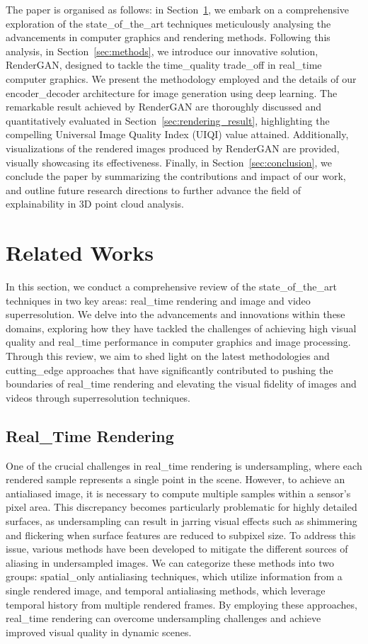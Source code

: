 The paper is organised as follows: in Section~\ref{sec:sota}, we embark on a comprehensive exploration of the state_of_the_art techniques meticulously analysing the advancements in computer graphics and rendering methods. Following this analysis, in Section~\ref{sec:methods}, we introduce our innovative solution, RenderGAN, designed to tackle the time_quality trade_off in real_time computer graphics. We present the methodology employed and the details of our encoder_decoder architecture for image generation using deep learning. The remarkable result achieved by RenderGAN are thoroughly discussed and quantitatively evaluated in Section~\ref{sec:rendering_result}, highlighting the compelling Universal Image Quality Index (UIQI) value attained. Additionally, visualizations of the rendered images produced by RenderGAN are provided, visually showcasing its effectiveness. Finally, in Section~\ref{sec:conclusion}, we conclude the paper by summarizing the contributions and impact of our work, and outline future research directions to further advance the field of explainability in 3D point cloud analysis.


\section{Related Works}
\label{sec:sota}
In this section, we conduct a comprehensive review of the state_of_the_art techniques in two key areas: real_time rendering and image and video superresolution. We delve into the advancements and innovations within these domains, exploring how they have tackled the challenges of achieving high visual quality and real_time performance in computer graphics and image processing. Through this review, we aim to shed light on the latest methodologies and cutting_edge approaches that have significantly contributed to pushing the boundaries of real_time rendering and elevating the visual fidelity of images and videos through superresolution techniques.

\subsection{Real_Time Rendering}
One of the crucial challenges in real_time rendering is undersampling, where each rendered sample represents a single point in the scene. However, to achieve an antialiased image, it is necessary to compute multiple samples within a sensor's pixel area. This discrepancy becomes particularly problematic for highly detailed surfaces, as undersampling can result in jarring visual effects such as shimmering and flickering when surface features are reduced to subpixel size. To address this issue, various methods have been developed to mitigate the different sources of aliasing in undersampled images. We can categorize these methods into two groups: spatial_only antialiasing techniques, which utilize information from a single rendered image, and temporal antialiasing methods, which leverage temporal history from multiple rendered frames. By employing these approaches, real_time rendering can overcome undersampling challenges and achieve improved visual quality in dynamic scenes.

